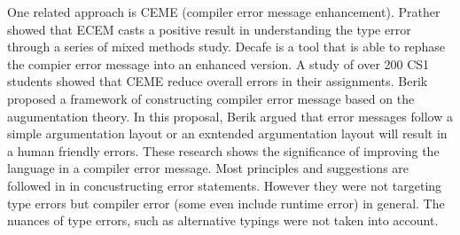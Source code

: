 One related approach is CEME (compiler error message enhancement). Prather showed that ECEM casts a positive result in understanding the type error through a series of mixed methods study. Decafe is a tool that is able to rephase the compier error message into an enhanced version. A study of over 200 CS1 students showed that CEME reduce overall errors in their assignments. Berik proposed a framework of constructing compiler error message based on the augumentation theory. In this proposal,  Berik argued that error messages  follow a simple argumentation layout or an exntended argumentation layout will result in a human friendly errors.  These research shows the significance of improving the language in a compiler error message. Most principles and suggestions are followed in \chameleon{} in concustructing error statements. However they were not targeting type errors but compiler error (some even include runtime error) in general. The nuances of type errors, such as alternative typings were not taken into account. 




